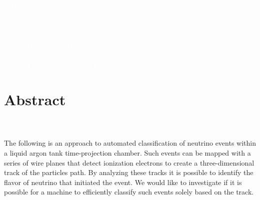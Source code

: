 \documentclass[svgnames]{report}
\begin{document}
\begin{titlepage}
\BgThispage
{}
\vspace*{.2\textheight}
\textcolor{white}{\Huge\textbf{\textsf{LArSoft and LArTPC \\ \\ Event Classification \\ \\ with Machine Learning}}} \\ \\
\textcolor{white}{\textbf{\textsf{Adam Costarino, Joshua Klein}}}
\vspace*{3.5cm}\par
\noindent
\begin{minipage}{\linewidth}
\vspace{3pt}
    \section*{Abstract}
         \\ \\
The following is an approach to automated classification of neutrino events within a liquid argon tank time-projection chamber. Such events can be mapped with a series of wire planes that detect ionization electrons to create a three-dimensional track of the particles path. By analyzing these tracks it is possible to identify the flavor of neutrino that initiated the event. We would like to investigate if it is possible for a machine to efficiently classify such events solely based on the track.  
\end{minipage}
\end{titlepage}
\end{document}
